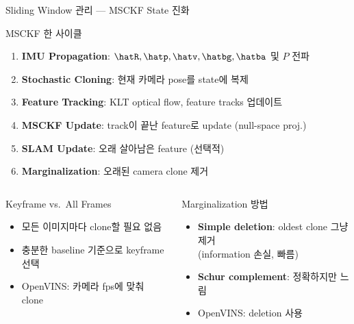 \begin{frame}{Sliding Window 관리 — MSCKF State 진화}
  \begin{block}{MSCKF 한 사이클}
    \begin{enumerate}
      \item \textbf{IMU Propagation}: $\hatR, \hatp, \hatv, \hatbg, \hatba$ 및 $P$ 전파
      \item \textbf{Stochastic Cloning}: 현재 카메라 pose를 state에 복제
      \item \textbf{Feature Tracking}: KLT optical flow, feature tracks 업데이트
      \item \textbf{MSCKF Update}: track이 끝난 feature로 update (null-space proj.)
      \item \textbf{SLAM Update}: 오래 살아남은 feature (선택적)
      \item \textbf{Marginalization}: 오래된 camera clone 제거
    \end{enumerate}
  \end{block}
  \begin{columns}[T]
      \begin{exampleblock}{Keyframe vs.\ All Frames}
        \begin{itemize}
          \item 모든 이미지마다 clone할 필요 없음
          \item 충분한 baseline 기준으로 keyframe 선택
          \item OpenVINS: 카메라 fps에 맞춰 clone
        \end{itemize}
      \end{exampleblock}
      \begin{alertblock}{Marginalization 방법}
        \begin{itemize}
          \item \textbf{Simple deletion}: oldest clone 그냥 제거\\
            (information 손실, 빠름)
          \item \textbf{Schur complement}: 정확하지만 느림
          \item OpenVINS: deletion 사용
        \end{itemize}
      \end{alertblock}
  \end{columns}
\end{frame}

